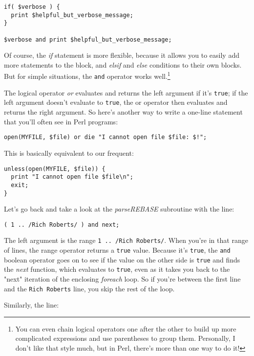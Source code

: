 \begin{lstlisting}
if( $verbose ) {
  print $helpful_but_verbose_message;
}

$verbose and print $helpful_but_verbose_message;
\end{lstlisting}

Of course, the \textit{if} statement is more flexible, because it allows you to easily add more statements to the block, and \textit{elsif} and \textit{else} conditions to their own blocks. But for simple situations, the \verb|and| operator works well.\footnote{You can even chain logical operators one after the other to build up more complicated expressions and use parentheses to group them. Personally, I don't like that style much, but in Perl, there's more than one way to do it!}

The logical operator \textit{or} evaluates and returns the left argument if it's \verb|true|; if the left argument doesn't evaluate to \verb|true|, the or operator then evaluates and returns the right argument. So here's another way to write a one-line statement that you'll often see in Perl programs: 

\begin{lstlisting}
open(MYFILE, $file) or die "I cannot open file $file: $!";
\end{lstlisting}

This is basically equivalent to our frequent:

\begin{lstlisting}
unless(open(MYFILE, $file)) {
  print "I cannot open file $file\n";
  exit;
}
\end{lstlisting}

Let's go back and take a look at the \textit{parseREBASE} subroutine with the line: 

\begin{lstlisting}
( 1 .. /Rich Roberts/ ) and next;
\end{lstlisting}

The left argument is the range \verb|1 .. /Rich Roberts/|. When you're in that range of lines, the range operator returns a \verb|true| value.  Because it's \verb|true|, the \verb|and| boolean operator goes on to see if the value on the other side is \verb|true| and finds the \textit{next} function, which evaluates to \verb|true|, even as it takes you back to the "next" iteration of the enclosing \textit{foreach} loop. So if you're between the first line and the \verb|Rich Roberts| line, you skip the rest of the loop.  

Similarly, the line:

